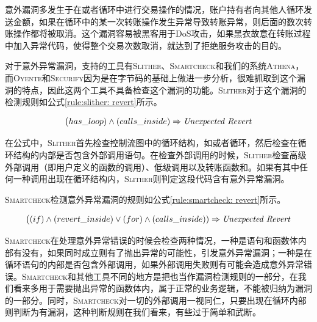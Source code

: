 意外漏洞多发生于在或者循环中进行交易操作的情况，账户持有者向其他人循环发送金额，如果在循环中的某一次转账操作发生异常导致转账异常，则后面的数次转账操作都将被取消。这个漏洞容易被黑客用于DoS攻击，如果黑衣故意在转账过程中加入异常代码，使得整个交易次数取消，就达到了拒绝服务攻击的目的。

对于意外异常漏洞，支持的工具有\textsc{Slither}、\textsc{Smartcheck}和我们的系统\textsc{Athena}，而\textsc{Oyente}和\textsc{Securify}因为是在字节码的基础上做进一步分析，很难抓取到这个漏洞的特点，因此这两个工具不具备检查这个漏洞的功能。\textsc{Slither}对于这个漏洞的检测规则如公式\ref{rule:slither: revert}所示。
\begin{mdframed}[
	linewidth = 1pt,
	innertopmargin = -5pt,
	innerbottommargin = 3pt,
	outerlinewidth = 1pt
	]
    \small
	\begin{equation} \label{rule:slither: revert}
    \big (has\_loop) \wedge (calls\_inside) \Rightarrow \text{\emph{Unexpected Revert}}
	\end{equation}
\end{mdframed}

在公式中，\textsc{Slither}首先检查控制流图中的循环结构，如或者循环，然后检查在循环结构的内部是否包含外部调用语句。在检查外部调用的时候，\textsc{Slither}检查高级外部调用（即用户定义的函数的调用）、低级调用以及转账函数和。如果有其中任何一种调用出现在循环结构内，\textsc{Slither}则判定这段代码含有意外异常漏洞。

\textsc{Smartcheck}检测意外异常漏洞的规则如公式\ref{rule:smartcheck: revert}所示。
\begin{mdframed}[
	linewidth = 1pt,
	innertopmargin = -5pt,
	innerbottommargin = 3pt,
	outerlinewidth = 1pt
	]
    \small
	\begin{equation} \label{rule:smartcheck: revert}
    \big ((if) \wedge (revert\_inside) \vee (for) \wedge (calls\_inside)) \Rightarrow \text{\emph{Unexpected Revert}}
	\end{equation}
\end{mdframed}
\textsc{Smartcheck}在处理意外异常错误的时候会检查两种情况，一种是语句和函数体内部有没有，如果同时成立则有了抛出异常的可能性，引发意外异常漏洞；一种是在循环语句的内部是否包含外部调用，如果外部调用失败则有可能会造成意外异常错误。\textsc{Smartcheck}和其他工具不同的地方是把也当作漏洞检测规则的一部分，在我们看来多用于需要抛出异常的函数体内，属于正常的业务逻辑，不能被归纳为漏洞的一部分。同时，\textsc{Smartcheck}对一切的外部调用一视同仁，只要出现在循环内部则判断为有漏洞，这种判断规则在我们看来，有些过于简单和武断。

